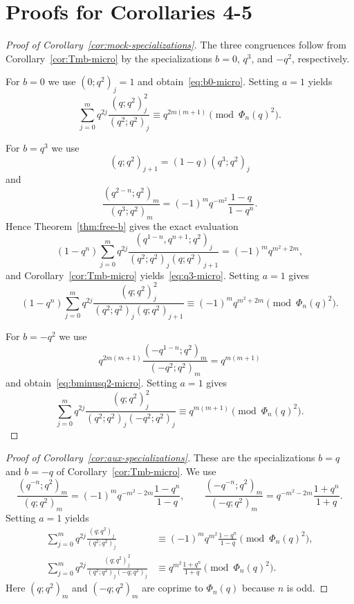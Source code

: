 \documentclass[reqno]{amsart}
\theoremstyle{definition}
\theoremstyle{plain}
\theoremstyle{remark}
\numberwithin{equation}{section}
\begin{document}
\section{Proofs for Corollaries 4-5}\label{sec:proof-cor45}

\begin{proof}[Proof of Corollary~\ref{cor:mock-specializations}]
The three congruences follow from Corollary~\ref{cor:Tmb-micro} by the specializations $b=0$, $q^3$, and $-q^2$, respectively.

For $b=0$ we use $(0;q^2)_j=1$ and obtain~\eqref{eq:b0-micro}. Setting $a=1$ yields
\begin{equation}\label{eq:b0-phi2}
\sum_{j=0}^{m} q^{2j}\frac{(q;q^2)_j^2}{(q^2;q^2)_j}
\equiv q^{2m(m+1)}
\pmod{\Phi_n(q)^2}.
\end{equation}

For $b=q^3$ we use
\[
(q;q^2)_{j+1}=(1-q)(q^3;q^2)_j
\]
and
\[
\frac{(q^{2-n};q^2)_m}{(q^3;q^2)_m}
=(-1)^m q^{-m^2}\frac{1-q}{1-q^n}.
\]
Hence Theorem~\ref{thm:free-b} gives the exact evaluation
\begin{equation}\label{eq:q3-exact-balanced}
(1-q^n)\sum_{j=0}^{m} q^{2j}\frac{(q^{1-n},q^{n+1};q^2)_j}{(q^2;q^2)_j(q;q^2)_{j+1}}
=
(-1)^m q^{m^2+2m},
\end{equation}
and Corollary~\ref{cor:Tmb-micro} yields~\eqref{eq:q3-micro}. Setting $a=1$ gives
\begin{equation}\label{eq:q3-phi2}
(1-q^n)\sum_{j=0}^{m} q^{2j}\frac{(q;q^2)_j^2}{(q^2;q^2)_j(q;q^2)_{j+1}}
\equiv (-1)^m q^{m^2+2m}
\pmod{\Phi_n(q)^2}.
\end{equation}

For $b=-q^2$ we use
\[
q^{2m(m+1)}\frac{(-q^{1-n};q^2)_m}{(-q^2;q^2)_m}=q^{m(m+1)}
\]
and obtain~\eqref{eq:bminusq2-micro}. Setting $a=1$ gives
\begin{equation}\label{eq:bminusq2-phi2}
\sum_{j=0}^{m} q^{2j}\frac{(q;q^2)_j^2}{(q^2;q^2)_j(-q^2;q^2)_j}
\equiv q^{m(m+1)}
\pmod{\Phi_n(q)^2}.
\end{equation}
\end{proof}

\begin{proof}[Proof of Corollary~\ref{cor:aux-specializations}]
These are the specializations $b=q$ and $b=-q$ of Corollary~\ref{cor:Tmb-micro}. We use
\[
\frac{(q^{-n};q^2)_m}{(q;q^2)_m}
=(-1)^m q^{-m^2-2m}\frac{1-q^n}{1-q},
\qquad
\frac{(-q^{-n};q^2)_m}{(-q;q^2)_m}
=q^{-m^2-2m}\frac{1+q^n}{1+q}.
\]
Setting $a=1$ yields
\begin{align}
\sum_{j=0}^{m} q^{2j}\frac{(q;q^2)_j}{(q^2;q^2)_j}
&\equiv (-1)^m q^{m^2}\frac{1-q^n}{1-q}
\pmod{\Phi_n(q)^2},\label{eq:bq-phi2}\\
\sum_{j=0}^{m} q^{2j}\frac{(q;q^2)_j^2}{(q^2;q^2)_j(-q;q^2)_j}
&\equiv q^{m^2}\frac{1+q^n}{1+q}
\pmod{\Phi_n(q)^2}.\label{eq:bminusq-phi2}
\end{align}
Here $(q;q^2)_m$ and $(-q;q^2)_m$ are coprime to $\Phi_n(q)$ because $n$ is odd.
\end{proof}
\end{document}
